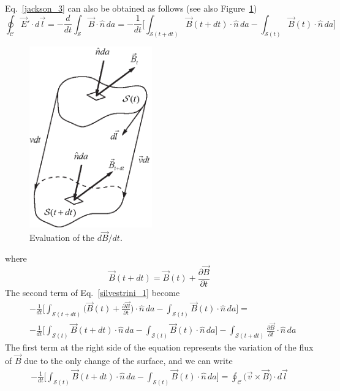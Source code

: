 \documentclass[11pt,a4paper,oneside]{book}
\numberwithin{equation}{section}
\theoremstyle{it}
\theoremstyle{definition}
\begin{document}
Eq.~\ref{jackson_3} can also be obtained as follows (see also 
Figure~\ref{panofky})
\begin{equation}\label{silvestrini_1}
	\oint_\mathcal{C}\vec{E}'\cdot d\vec{l} = -\frac{d}{dt}\int_\mathcal 
	{S}\vec{B}\cdot\hat{n}\,da = 
	-\frac{1}{dt}\Bigg[\int_{\mathcal{S}(t+dt)}\vec{B}(t+dt)\cdot\hat{n}\,da-\int_{\mathcal{S}(t)}\vec{B}(t)\cdot\hat{n}\,da\Bigg]
\end{equation}
\begin{figure}[H]
	\centering
	\includegraphics[width = 150pt, angle = 0, 
	keepaspectratio]{figures/appendix/panofsky.eps}
	\captionsetup{width=0.75\textwidth}		
	\caption{Evaluation of the $d\vec{B}/dt$.}
	\label{panofky}
\end{figure}
where 
\begin{equation}
	\vec{B}(t+dt)=\vec{B}(t)+\frac{\partial\vec{B}}{\partial t}
\end{equation}
The second term of Eq.~\ref{silvestrini_1} become
\begin{equation}\label{silvestrini_2}
	\begin{aligned}
		& 
		-\frac{1}{dt}\Bigg[\int_{\mathcal{S}(t+dt)} 
		\Big(\vec{B}(t)+\frac{\partial\vec{B}}{\partial 
		t}\Big)\cdot\hat{n}\,da-\int_{\mathcal{S}(t)} 
		\vec{B}(t)\cdot\hat{n}\,da\Bigg] = \\[8pt]
		& -\frac{1}{dt}\Bigg[\int_{\mathcal{S}(t)} 
		\vec{B}(t+dt)\cdot\hat{n}\,da 
		-\int_{\mathcal{S}(t)}\vec{B}(t) 
		\cdot\hat{n}\,da\Bigg]-\int_{\mathcal{S}(t+dt)} 
		\frac{\partial\vec{B}}{\partial
		 t}\cdot\hat{n}\,da
	\end{aligned}
\end{equation}
The first term at the right side of the equation represents the variation of 
the flux of $\vec{B}$ due to the only change of the surface, and we can write
\begin{equation}\label{silvestrini_3}
	\begin{aligned}
		-\frac{1}{dt}\Bigg[\int_{\mathcal{S}(t)}\vec{B}(t+dt)\cdot\hat{n}\,da 
		-\int_{\mathcal{S}(t)}\vec{B}(t)\cdot\hat{n}\,da\Bigg] = 
		\oint_\mathcal{C}\Big(\vec{v}\times\vec{B}\Big)\cdot d\vec{l}
	\end{aligned}
\end{equation}
\end{document}
